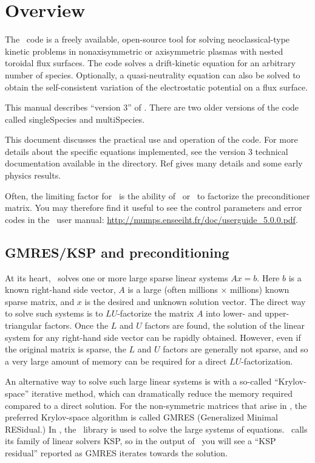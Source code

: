 \chapter{Overview}


The \sfincs~code is a freely available, open-source tool for solving neoclassical-type kinetic problems in nonaxisymmetric or axisymmetric plasmas
with nested toroidal flux surfaces.
The code solves a drift-kinetic equation for an arbitrary number of species.  Optionally, a quasi-neutrality
equation can also be solved to obtain the self-consistent variation of the electrostatic potential on a flux surface.

This manual describes ``version 3'' of \sfincs.  There are two older versions of the
code called singleSpecies and multiSpecies.

This document discusses the practical use and operation of the code.  For more details about the specific equations implemented,
see the version 3 technical documentation available in the  directory.
Ref \cite{sfincsPaper} gives many details and some early physics results.

Often, the limiting factor for \sfincs~is the ability of \mumps~or \superludist~to factorize the preconditioner matrix.
You may therefore find it useful to see the control parameters and error codes in the \mumps~user manual:
\url{http://mumps.enseeiht.fr/doc/userguide_5.0.0.pdf}.



\section{GMRES/KSP and preconditioning}
\label{sec:gmres}

At its heart, \sfincs~solves one or more large sparse linear systems $Ax=b$.  Here $b$ is a known right-hand side vector,
$A$ is a large (often millions $\times$ millions) known sparse matrix, and $x$ is the desired and unknown solution vector.
The direct way to solve such systems is to $LU$-factorize
the matrix $A$ into lower- and upper-triangular factors.
Once the $L$ and $U$ factors are found, the solution of the linear system
for any right-hand side vector can be rapidly obtained.  However, even if the original matrix is sparse, the $L$ and $U$ factors
are generally not sparse, and so a very large amount of memory can be required for a direct $LU$-factorization.

An alternative way to solve
such large linear systems is with a so-called ``Krylov-space'' iterative method, which can dramatically reduce the memory required
compared to a direct solution.  For the non-symmetric matrices that arise in \sfincs, the preferred Krylov-space
algorithm is called GMRES (Generalized Minimal RESidual.)  In \sfincs, the \PETSc~library is used to solve the large systems
of equations. \PETSc~calls its family of linear solvers KSP, so in the output of \sfincs~you will see a ``KSP residual'' reported
as GMRES iterates towards the solution.

